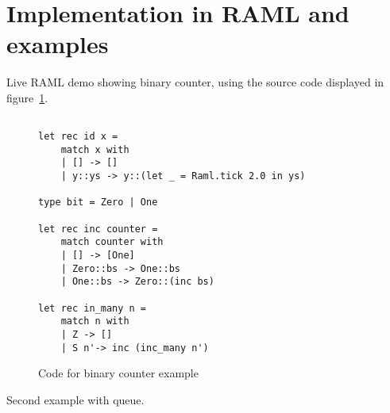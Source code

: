 \documentclass{article}
\begin{document}
\section{Implementation in RAML and examples}
Live RAML demo showing binary counter, using the source code displayed in figure~\ref{code:binary-counter}.
\begin{figure}[ht]
\begin{lstlisting}[language=caml,frame=single,basicstyle=\footnotesize]

let rec id x =
    match x with
    | [] -> []
    | y::ys -> y::(let _ = Raml.tick 2.0 in ys)

type bit = Zero | One

let rec inc counter = 
    match counter with
    | [] -> [One]
    | Zero::bs -> One::bs 
    | One::bs -> Zero::(inc bs)

let rec in_many n = 
    match n with
    | Z -> []
    | S n'-> inc (inc_many n')
\end{lstlisting}
\label{code:binary-counter}
\caption{Code for binary counter example}
\end{figure}
Second example with queue.
\end{document}
